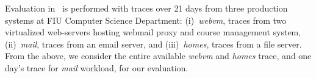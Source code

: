 Evaluation in~\cite{iodedup} is performed with 
traces over 21 days from three production systems
at FIU Computer Science Department:
(i)~\textit{webvm}, traces from two virtualized web-servers hosting webmail
proxy and course management system, (ii)~\textit{mail}, traces from an
email server, and (iii)~\textit{homes}, traces from a file server.
From the above,
we consider the entire available \textit{webvm}
and \textit{homes} trace, and one day's trace for \textit{mail} workload,
for our evaluation.

\begin{figure}[t]
    	\hfill
     \\
	\null\hfill

\end{figure}
